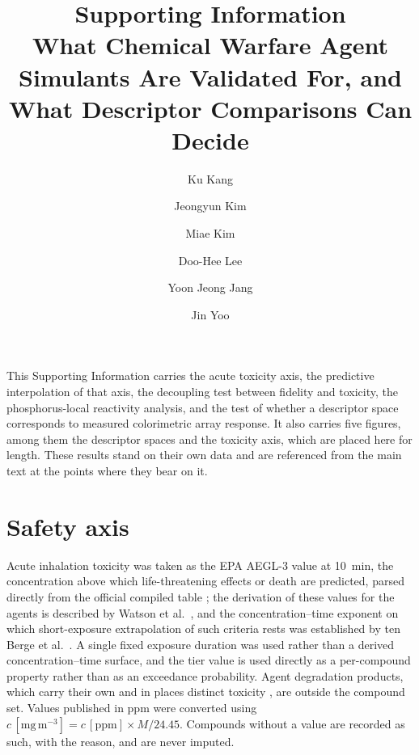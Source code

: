 \documentclass[11pt,a4paper]{article}
\title{Supporting Information\\[4pt]
\large What Chemical Warfare Agent Simulants Are Validated For, and What Descriptor Comparisons Can Decide}
\author{Ku Kang \and Jeongyun Kim \and Miae Kim \and Doo-Hee Lee
  \and Yoon Jeong Jang \and Jin Yoo}
\date{}
\begin{document}
\maketitle

\noindent This Supporting Information carries the acute toxicity axis, the
predictive interpolation of that axis, the decoupling test between fidelity and
toxicity, the phosphorus-local reactivity analysis, and the test of whether a
descriptor space corresponds to measured colorimetric array response. It also carries five figures, among them the descriptor
spaces and the toxicity axis, which are placed here for length. These results
stand on their own data and are referenced from the main text at the points
where they bear on it.

\section{Safety axis}
\label{meth:aegl}
Acute inhalation toxicity was taken as the EPA AEGL-3 value at 10~min,
the concentration above which life-threatening effects or death are predicted,
parsed directly from the official compiled table \cite{epaaegl2018}; the
derivation of these values for the agents is described by
Watson et al.~\cite{watson2006}, and the concentration--time exponent on which short-exposure
extrapolation of such criteria rests was established by ten Berge et al.~\cite{tenberge1986}.
A single fixed exposure duration was used rather than a derived
concentration--time surface, and the tier value is used directly as a
per-compound property rather than as an exceedance probability. Agent
degradation products, which carry their own and in places
distinct toxicity \cite{munro1999}, are outside the compound set. Values
published in ppm were converted using
$c\,[\mathrm{mg\,m^{-3}}] = c\,[\mathrm{ppm}] \times M / 24.45$. Compounds
without a value are recorded as such, with the reason, and are never imputed.
\end{document}
